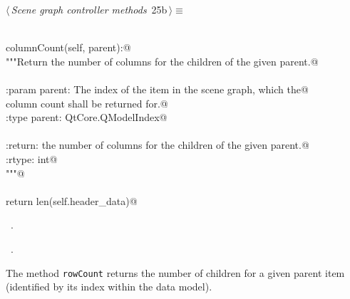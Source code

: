 \documentclass[
    a4paper,      %
    10pt,         %
    openright,    %
    notitlepage,  %
    parskip=half, %
]{scrreprt}       %
\theoremstyle{definition}                    %
\begin{document}
\begin{flushleft} \small
\begin{minipage}{\linewidth}\label{scrap21}\raggedright\small
{} $\langle\,${\itshape Scene graph controller methods}\nobreak\ {\footnotesize {25b}}$\,\rangle\equiv$
\vspace{-1ex}
\begin{list}{}{} \item
\mbox{}\lstinline@@\\
\mbox{}\lstinline@def columnCount(self, parent):@\\
\mbox{}\lstinline@    """Return the number of columns for the children of the given parent.@\\
\mbox{}\lstinline@@\\
\mbox{}\lstinline@    :param parent: The index of the item in the scene graph, which the@\\
\mbox{}\lstinline@                    column count shall be returned for.@\\
\mbox{}\lstinline@    :type  parent: QtCore.QModelIndex@\\
\mbox{}\lstinline@@\\
\mbox{}\lstinline@    :return: the number of columns for the children of the given parent.@\\
\mbox{}\lstinline@    :rtype:  int@\\
\mbox{}\lstinline@    """@\\
\mbox{}\lstinline@@\\
\mbox{}\lstinline@    return len(self.header_data)@\\
\mbox{}\lstinline@@{\NWsep}
\end{list}
\vspace{-1.5ex}
\footnotesize
\begin{list}{}{\setlength{\itemsep}{-\parsep}\setlength{\itemindent}{-\leftmargin}}
\item \NWtxtMacroDefBy\ .
\item \NWtxtMacroRefIn\ .

\item{}
\end{list}
\end{minipage}\vspace{4ex}
\end{flushleft}
The method \verb+rowCount+ returns the number of children for a given parent
item (identified by its index within the data model).
\end{document}
